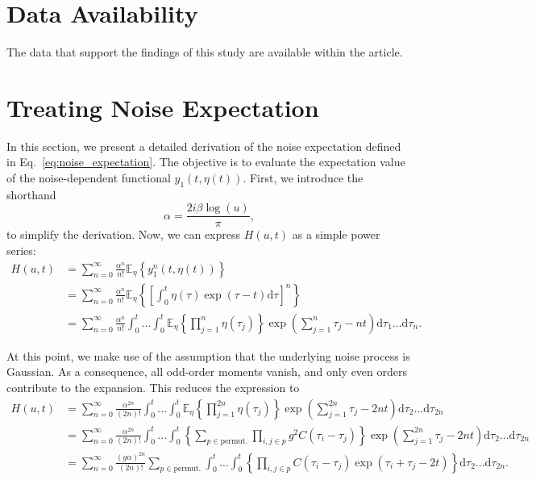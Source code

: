 \documentclass[reprint,amsmath,amssymb,aps]{revtex4-2}
\begin{document}

\section*{Data Availability}
The data that support the findings of this study are available
within the article.

\appendix
\onecolumngrid
\section{Treating Noise Expectation}
\label{app:treating_noise_expectation}

In this section, we present a detailed derivation of the noise expectation defined in Eq.~\eqref{eq:noise_expectation}. The objective is to evaluate the expectation value of the noise-dependent functional $y_1(t, \eta(t))$. First, we introduce the shorthand
\[
\alpha = \frac{2 i \beta \log(u)}{\pi},
\]
to simplify the derivation. Now, we can express $H(u,t)$ as a simple power series:
\begin{align*}
    H(u,t)
    &=
    \sum_{n=0}^\infty
    \frac{\alpha^n}{n!} 
    \mathbb{E}_{\eta} \left\{
    y_1^n(t, \eta(t))
    \right\} \\
    &=
    \sum_{n=0}^\infty
    \frac{\alpha^n}{n!} 
    \mathbb{E}_{\eta} \left\{
    \left[\int_0^t \eta(\tau)\exp\left(\tau-t\right) \mathrm{d}\tau\right]^n
    \right\} \\
    &=
    \sum_{n=0}^\infty
    \frac{\alpha^n}{n!} 
    \int_0^t
    ...
    \int_0^t
    \mathbb{E}_{\eta} \left\{
    \prod_{j=1}^{n}
    \eta(\tau_j)
    \right\}
    \exp\left(\sum_{j=1}^n\tau_j-nt\right) \mathrm{d}\tau_1
    ...
    \mathrm{d}\tau_n .
\end{align*}

At this point, we make use of the assumption that the underlying noise process is Gaussian. As a consequence, all odd-order moments vanish, and only even orders contribute to the expansion. This reduces the expression to
\begin{align*}
    H(u, t)
    &=
    \sum_{n=0}^\infty
    \frac{\alpha^{2n}}{(2n)!} 
    \int_0^t
    ...
    \int_0^t
    \mathbb{E}_{\eta} \left\{
    \prod_{j=1}^{2n}
    \eta(\tau_j)
    \right\}
    \exp\left( \sum_{j=1}^{2n}\tau_j-2nt\right) \mathrm{d}\tau_2
    ...
    \mathrm{d}\tau_{2n} \\
    & =
    \label{eq:isserlis_theorem_asssumption}
    \sum_{n=0}^\infty
    \frac{\alpha^{2n}}{(2n)!} 
    \int_0^t
    ...
    \int_0^t
    \left\{
    \sum_{p\in\text{permut.}}
    \prod_{i,j\in p}
    g^2 C(\tau_i-\tau_j)
    \right\}
    \exp\left( \sum_{j=1}^{2n}\tau_j-2nt\right) \mathrm{d}\tau_2
    ...
    \mathrm{d}\tau_{2n} \\
    & =
    \sum_{n=0}^\infty
    \frac{\left( g \alpha\right)^{2n}}{(2n)!} 
    \sum_{p\in\text{permut.}}
    \int_0^t
    ...
    \int_0^t
    \left\{
    \prod_{i,j\in p}
    C(\tau_i-\tau_j)
    \exp\left(
    \tau_i + \tau_j - 2t\right)
    \right\}
    \mathrm{d}\tau_2
    ...
    \mathrm{d}\tau_{2n}.
\end{align*}
\end{document}
